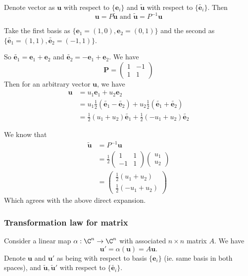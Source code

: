 \documentclass[a4paper]{article}
\begin{document}
  \begin{thm}Denote vector as $\mathbf{u}$ with respect to $\{\mathbf{e}_i\}$ and $\tilde{\mathbf{u}}$ with respect to $\{\tilde{\mathbf{e}_i}\}$. Then 
    \[
      \mathbf{u} = P\mathbf{\tilde{u}}\text{ and }\mathbf{\tilde{u}} = P^{-1}\mathbf{u}
    \]
  \end{thm}

  \begin{eg}
    Take the first basis as $\{\mathbf{e}_1 = (1, 0), \mathbf{e}_2 = (0, 1)\}$ and the second as $\{\tilde{\mathbf{e}_1} = (1, 1), \tilde{\mathbf{e}_2} = (-1, 1)\}$.

    So $\tilde{\mathbf{e}_1} = \mathbf{e}_1 + \mathbf{e}_2$ and $\tilde{\mathbf{e}_2} = -\mathbf{e}_1 + \mathbf{e}_2$. We have
    \[
      \mathbf{P} = 
      \begin{pmatrix}
        1 & -1\\
        1 & 1
      \end{pmatrix}
    \]
    Then for an arbitrary vector $\mathbf{u}$, we have
    \begin{align*}
      \mathbf{u}&= u_1\mathbf{e}_1 + u_2\mathbf{e}_2\\
      &= u_1\frac{1}{2}(\tilde{\mathbf{e}_1} - \tilde{\mathbf{e}_2}) + u_2\frac{1}{2}(\tilde{\mathbf{e}_1} + \tilde{\mathbf{e}_2})\\
      &= \frac{1}{2}(u_1 + u_2)\tilde{\mathbf{e}_1} + \frac{1}{2}(-u_1 + u_2)\tilde{\mathbf{e}_2}
    \end{align*}

    We know that
    \begin{align*}
      \mathbf{\tilde{u}} &= P^{-1} \mathbf{u}\\
      &= \frac{1}{2}
      \begin{pmatrix}
        1&1\\-1&1
      \end{pmatrix}
      \begin{pmatrix}
        u_1\\u_2
      \end{pmatrix}\\
      &= 
      \begin{pmatrix}
        \frac{1}{2}(u_1 + u_2)\\
        \frac{1}{2}(-u_1 + u_2)
      \end{pmatrix}
    \end{align*}
    Which agrees with the above direct expansion.
  \end{eg}
  \subsubsection{Transformation law for matrix}
  Consider a linear map $\alpha: \C^n \to \C^n$ with associated $n\times n$ matrix $A$. We have
  \[
    \mathbf{u}' = \alpha(\mathbf{u}) = A\mathbf{u}.
  \]
  Denote $\mathbf{u}$ and $\mathbf{u}'$ as being with respect to basis $\{\mathbf{e}_i\}$ (ie. same basis in both spaces), and $\mathbf{\tilde{u}, \tilde{u}'}$ with respect to $\{\tilde{\mathbf{e}_i}\}$.
\end{document}
